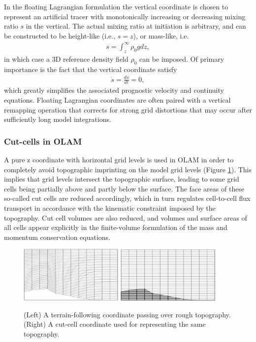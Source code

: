 \documentclass[gmd, manuscript]{copernicus}
\begin{document}
In the floating Lagrangian formulation \citep{starr1945quasi, lin2004vertically} the vertical coordinate is chosen to represent an artificial tracer with monotonically increasing or decreasing mixing ratio $s$ in the vertical.  The actual mixing ratio at initiation is arbitrary, and can be constructed to be height-like (i.e., $s = z$), or mass-like, i.e.
\begin{align}
s = \int^{\infty}_{z} \rho_0 g dz,
\end{align} in which case a 3D reference density field $\rho_0$ can be imposed.  Of primary importance is the fact that the vertical coordinate satisfy
\begin{align}
\dot{s} = \frac{ds}{dt} = 0,
\end{align} which greatly simplifies the associated prognostic velocity and continuity equations.  Floating Lagrangian coordinates are often paired with a vertical remapping operation that corrects for strong grid distortions that may occur after sufficiently long model integrations.

\subsubsection{Cut-cells in OLAM} \label{sec:CutCells}

A pure z coordinate with horizontal grid levels is used in OLAM \citep{walko2008ocean2} in order to completely avoid topographic imprinting on the model grid levels (Figure \ref{fig:OLAM_CutCell}). This implies that grid levels intersect the topographic surface, leading to some grid cells being partially above and partly below the surface. The face areas of these so-called cut cells are reduced accordingly, which in turn regulates cell-to-cell flux transport in accordance with the kinematic constraint imposed by the topography. Cut cell volumes are also reduced, and volumes and surface areas of all cells appear explicitly in the finite-volume formulation of the mass and momentum conservation equations.

\begin{figure}
\begin{center}
\includegraphics[width=2in]{OLAM_CutCellA.png} \quad \includegraphics[width=2in]{OLAM_CutCellB.png}
\end{center}
\caption{(Left) A terrain-following coordinate passing over rough topography.  (Right) A cut-cell coordinate used for representing the same topography.} \label{fig:OLAM_CutCell}
\end{figure}
\end{document}

